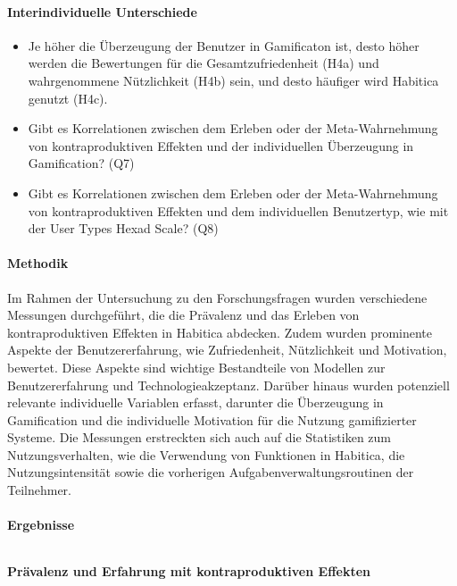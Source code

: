 \documentclass[sigconf, nonacm]{acmart}
\begin{document}
\paragraph{Interindividuelle Unterschiede}

\begin{itemize}
    \item Je höher die Überzeugung der Benutzer in Gamificaton ist, desto höher werden die Bewertungen für die Gesamtzufriedenheit (H4a) und wahrgenommene Nützlichkeit (H4b) sein, und desto häufiger wird Habitica genutzt (H4c).
    \item Gibt es Korrelationen zwischen dem Erleben oder der Meta-Wahrnehmung von kontraproduktiven Effekten und der individuellen Überzeugung in Gamification? (Q7)
    \item Gibt es Korrelationen zwischen dem Erleben oder der Meta-Wahrnehmung von kontraproduktiven Effekten und dem individuellen Benutzertyp, wie mit der User Types Hexad Scale? (Q8)
\end{itemize}

\paragraph{Methodik}
Im Rahmen der Untersuchung zu den Forschungsfragen wurden verschiedene Messungen durchgeführt, die die Prävalenz und das Erleben von kontraproduktiven Effekten in Habitica abdecken. Zudem wurden prominente Aspekte der Benutzererfahrung, wie Zufriedenheit, Nützlichkeit und Motivation, bewertet. Diese Aspekte sind wichtige Bestandteile von Modellen zur Benutzererfahrung und Technologieakzeptanz.
Darüber hinaus wurden potenziell relevante individuelle Variablen erfasst, darunter die Überzeugung in Gamification und die individuelle Motivation für die Nutzung gamifizierter Systeme. Die Messungen erstreckten sich auch auf die Statistiken zum Nutzungsverhalten, wie die Verwendung von Funktionen in Habitica, die Nutzungsintensität sowie die vorherigen Aufgabenverwaltungsroutinen der Teilnehmer.

\paragraph{Ergebnisse}$~$

\textbf{Prävalenz und Erfahrung mit kontraproduktiven Effekten}
\end{document}
